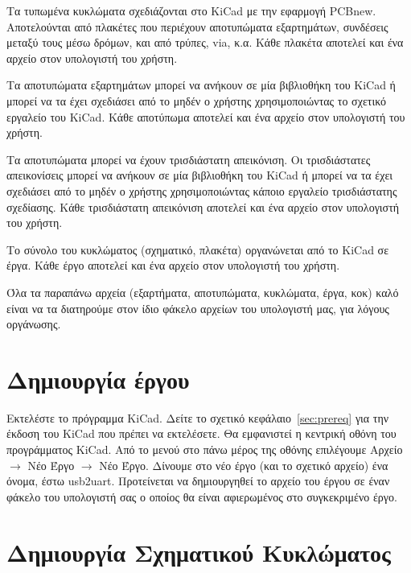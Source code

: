 \documentclass[a4paper]{article}
\begin{document}
Τα τυπωμένα κυκλώματα σχεδιάζονται στο \textenglish{KiCad} με την εφαρμογή PCBnew. Αποτελούνται από πλακέτες που περιέχουν αποτυπώματα εξαρτημάτων, συνδέσεις μεταξύ τους μέσω δρόμων, και από τρύπες, via, κ.α.
Κάθε πλακέτα αποτελεί και ένα αρχείο στον υπολογιστή του χρήστη. 

Τα αποτυπώματα εξαρτημάτων μπορεί να ανήκουν σε μία βιβλιοθήκη του \textenglish{KiCad} ή μπορεί να τα έχει σχεδιάσει από το μηδέν ο χρήστης χρησιμοποιώντας το σχετικό εργαλείο του \textenglish{KiCad}. Κάθε αποτύπωμα αποτελεί και ένα αρχείο στον υπολογιστή του χρήστη. 

Τα αποτυπώματα μπορεί να έχουν τρισδιάστατη απεικόνιση. Οι τρισδιάστατες απεικονίσεις μπορεί να ανήκουν σε μία βιβλιοθήκη του \textenglish{KiCad} ή μπορεί να τα έχει σχεδιάσει από το μηδέν ο χρήστης χρησιμοποιώντας κάποιο εργαλείο τρισδιάστατης σχεδίασης. Κάθε τρισδιάστατη απεικόνιση αποτελεί και ένα αρχείο στον υπολογιστή του χρήστη. 

Το σύνολο του κυκλώματος (σχηματικό, πλακέτα) οργανώνεται από το \textenglish{KiCad} σε έργα. Κάθε έργο αποτελεί και ένα αρχείο στον υπολογιστή του χρήστη. 

Όλα τα παραπάνω αρχεία (εξαρτήματα, αποτυπώματα, κυκλώματα, έργα, κοκ) καλό είναι να τα διατηρούμε στον ίδιο φάκελο αρχείων του υπολογιστή μας, για λόγους οργάνωσης.

\section{Δημιουργία έργου}
Εκτελέστε το πρόγραμμα \textenglish{KiCad}. Δείτε το σχετικό κεφάλαιο~\ref{sec:prereq} για την έκδοση του \textenglish{KiCad} που πρέπει να εκτελέσετε. Θα εμφανιστεί η κεντρική οθόνη του προγράμματος \textenglish{KiCad}. Από το μενού στο πάνω μέρος της οθόνης επιλέγουμε Αρχείο $\rightarrow$ Νέο Έργο $\rightarrow$ Νέο Έργο. Δίνουμε στο νέο έργο (και το σχετικό αρχείο) ένα όνομα, έστω usb2uart. Προτείνεται να δημιουργηθεί το αρχείο του έργου σε έναν φάκελο του υπολογιστή σας ο οποίος θα είναι αφιερωμένος στο συγκεκριμένο έργο.

\begin{figure}
  \begin{center}
    \label{fig:kicad-main}
  \end{center}
\end{figure}


\section{Δημιουργία Σχηματικού Κυκλώματος}
\end{document}
